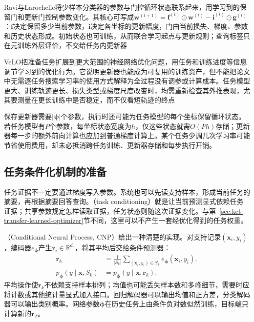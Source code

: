 Ravi与Larochelle将少样本分类器的参数与门控循环状态联系起来，用学习到的保留门和更新门控制参数变化。其核心可写成$\bm w^{(t+1)}=\bm f^{(t)}\odot\bm w^{(t)}-\bm i^{(t)}\odot\bm g^{(t)}$：$\bm f$决定保留多少当前参数，$\bm i$决定各坐标的更新幅度，门由当前损失、梯度、参数和历史状态形成。初始状态也可训练，从而联合学习起点与更新规则；查询标签只在元训练外层评价，不交给任务内更新器

VeLO把准备任务扩展到更大范围的神经网络优化问题，用任务和训练进度等信息调节学习到的优化行为。它说明更新器也能成为可复用的训练资产，但不能把论文中无需逐任务搜索学习率的使用方式解释为全过程没有调参或计算成本。任务模型更大、训练轨迹更长、损失类型或梯度尺度改变时，均需重新检查其外推表现，尤其要测量在更长训练中是否稳定，而不仅看短轨迹的终点

保存更新器需要$|\bm\psi|$个参数，执行时还可能为任务模型的每个坐标保留循环状态。若任务模型有$P$个参数，每坐标状态宽度为$h$，仅这些状态就需$O(Ph)$存储；更新器每一步的额外前向计算也应加到普通梯度计算上。某个任务少调几次学习率可能节省使用费用，却未必抵消跨任务训练、更新器存储和每步执行开销。

\subsection{任务条件化机制的准备}
\label{sec:ket-transfer-conditioning-preparation}

任务证据不一定要通过梯度写入参数。系统也可以先读支持样本，形成当前任务的摘要，再根据摘要回答查询。（task conditioning）就是让当前预测显式依赖任务证据；共享参数规定怎样读取证据，任务状态则随这次证据变化。与第~\ref{sec:ket-transfer-learned-optimizer}节不同，这里可以不产生一套经优化得到的任务权重。

（Conditional Neural Process, CNP）给出一种清楚的实现。对支持记录$(\bm x_i,y_i)$，编码器$e_{\bm\phi}$产生$\bm r_i\in\mathbb R^{d_r}$，将其平均后交给条件预测器：
\begin{align}
  \bm r_k&=\frac1{|S_k|}\sum_{(\bm x_i,y_i)\in S_k}
                   e_{\bm\phi}(\bm x_i,y_i), \nonumber\\
  p_{\bm\phi}(y\mid\bm x,S_k)
      &=p_{\bm\phi}(y\mid\bm x,\bm r_k).
  \label{eq:ket-transfer-cnp}
\end{align}
平均操作使$\bm r_k$不依赖支持样本排列；均值也可能丢失样本数和多峰细节，需要时应将计数或其他统计量显式加入接口。回归解码器可以输出均值和正方差，分类解码器可以输出类别概率。网络参数$\bm\phi$在历史任务上由条件负对数似然训练，目标端只计算新的$\bm r_T$。

